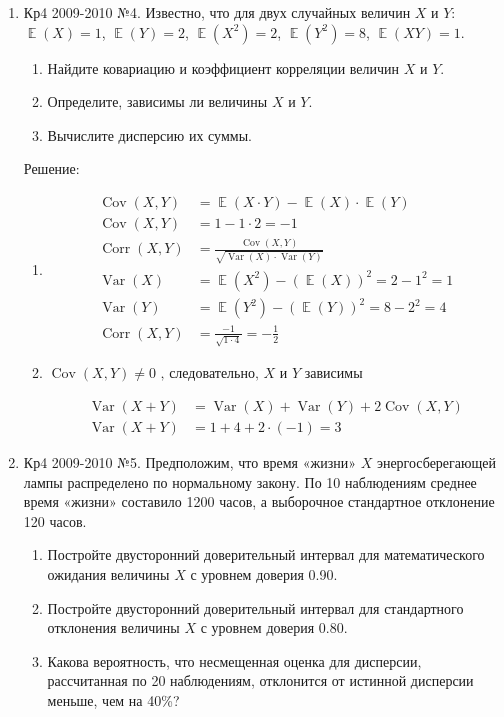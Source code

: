 \documentclass[a4paper,11pt]{article}
\DeclareMathOperator{\cov}{Cov}
\DeclareMathOperator{\Var}{Var}
\DeclareMathOperator{\Cov}{Cov}
\DeclareMathOperator{\Corr}{Corr}
\DeclareMathOperator{\E}{\mathbb{E}}
\begin{document}
\begin{enumerate}
\item \label{Кр4 2009-2010 №4} Кр4 2009-2010 №4. Известно, что для двух случайных величин $X$ и $Y$: $\E(X)=1$, $\E(Y)=2$, $\E(X^2)=2$, $\E(Y^2)=8$, $\E(XY)=1$.
\begin{enumerate}
\item Найдите ковариацию и коэффициент корреляции величин $X$ и $Y$.
\item Определите, зависимы ли величины $X$ и $Y$.
\item Вычислите дисперсию их суммы.
\end{enumerate}

Решение:
\begin{enumerate}
\item
\begin{align*}
\Cov (X, Y) &= \E(X \cdot Y) - \E(X) \cdot \E(Y) \\
\Cov (X, Y) &= 1-1 \cdot 2 = -1 \\
\Corr(X, Y) &= \frac{\cov(X,Y)}{\sqrt{\Var(X) \cdot \Var(Y)}} \\
\Var(X) &= \E(X^2) - (\E(X))^2  = 2 - 1^2 = 1\\
\Var(Y) &= \E(Y^2) - (\E(Y))^2  = 8 - 2^2 = 4\\
\Corr (X,Y) &= \frac{-1}{\sqrt{1 \cdot 4}} = - \frac{1}{2}
\end{align*}

\item $\cov(X,Y) \neq 0 \text{ , следовательно, } X$ и $Y$ зависимы

\begin{align*}
\Var(X + Y) &= \Var(X) + \Var(Y) + 2 \cov(X,Y) \\ 
\Var(X + Y) &= 1 + 4 + 2 \cdot (-1) = 3
\end{align*}
\end{enumerate}

\item \label{Кр4 2009-2010 №5} Кр4 2009-2010 №5. Предположим, что время «жизни» $X$ энергосберегающей лампы распределено по нормальному закону. По 10 наблюдениям среднее время «жизни» составило 1200 часов, а выборочное стандартное отклонение 120 часов.
\begin{enumerate}
\item Постройте двусторонний доверительный интервал для математического ожидания величины $X$ с уровнем доверия 0.90.
\item Постройте двусторонний доверительный интервал для стандартного отклонения величины $X$ с уровнем доверия 0.80.
\item Какова вероятность, что несмещенная оценка для дисперсии, рассчитанная по 20 наблюдениям, отклонится от истинной дисперсии меньше, чем на 40\%?
\end{enumerate}


\end{enumerate}
\end{document}
